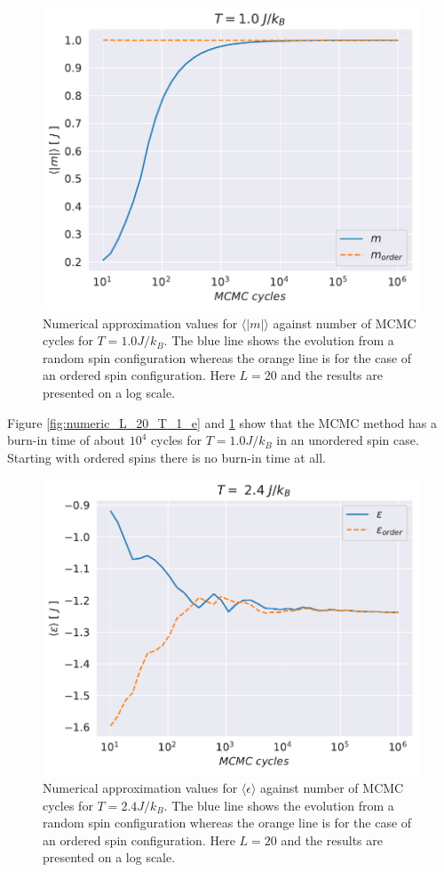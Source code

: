 \documentclass[english,notitlepage,reprint,nofootinbib]{revtex4-1}  %
\begin{document}
\begin{figure}[H]
    \centering
    \includegraphics[width=.5\textwidth]{../figures/numeric_L_20_T_1_m.pdf}
    \caption{Numerical approximation values for $\langle |m| \rangle$ against number of MCMC cycles for $T=1.0 J/k_B$. The blue line shows the evolution from a random spin configuration whereas the orange line is for the case of an ordered spin configuration. Here $L=20$ and the results are presented on a log scale.}
    \label{fig:numeric_L_20_T_1_m}
\end{figure}
Figure \ref{fig:numeric_L_20_T_1_e} and \ref{fig:numeric_L_20_T_1_m} show that the MCMC method has a burn-in time of about $10^4$ cycles for $T=1.0J/k_B$ in an unordered spin case. Starting with ordered spins there is no burn-in time at all.

\begin{figure}[H]
    \centering
    \includegraphics[width=.5\textwidth]{../figures/numeric_L_20_T_2_4_e.pdf}
    \caption{Numerical approximation values for $\langle \epsilon \rangle$ against number of MCMC cycles for $T=2.4 J/k_B$. The blue line shows the evolution from a random spin configuration whereas the orange line is for the case of an ordered spin configuration. Here $L=20$ and the results are presented on a log scale.}
    \label{fig:numeric_L_20_T_2_4_e}
\end{figure}
\end{document}
